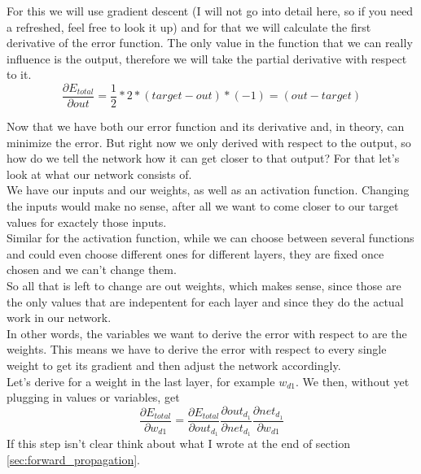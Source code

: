 \documentclass[11pt, halfparskip]{article}
\begin{document}
    \newpage
    \noindent
    For this we will use gradient descent (I will not go into detail here, so if you need a refreshed, feel free to look it up) and for that we will calculate the first derivative of the error
    function. The only value in the function that we can really influence is the output, therefore we will take the partial derivative with respect to it.
    \begin{equation}
    \label{eq:squared_error_derivative}
    	\frac{\partial E_{total}}{\partial out} = \frac{1}{2}*2*(target - out) * (-1) = (out - target)
    \end{equation}
    
    \noindent \newline
    Now that we have both our error function and its derivative and, in theory, can minimize the error. But right now we only derived with respect to the output, so how do we tell the
    network how it can get closer to that output? For that let's look at what our network consists of.\\
    We have our inputs and our weights, as well as an activation function. Changing the inputs would make no sense, after all we want to come closer to our target values for exactely
    those inputs.\\
    Similar for the activation function, while we can choose between several functions and could even choose different ones for different layers, they are fixed once chosen
    and we can't change them.\\
    So all that is left to change are out weights, which makes sense, since those are the only values that are indepentent for each layer and since they do the actual work in our network.\\
    In other words, the variables we want to derive the error with respect to are the weights. This means we have to derive the error with respect to every single weight to get its
    gradient and then adjust the network accordingly.\\
    Let's derive for a weight in the last layer, for example $w_{d1}$. We then, without yet plugging in values or variables, get
    \begin{equation}
    \label{eq:output_layer_derivative}
    	\frac{\partial E_{total}}{\partial w_{d1}} = \frac{\partial E_{total}}{\partial out_{d_1}} \frac{\partial out_{d_1}}{\partial net_{d_1}} \frac{\partial net_{d_1}}{\partial w_{d1}}
    \end{equation}
    If this step isn't clear think about what I wrote at the end of section \ref{sec:forward_propagation}.\\
\end{document}
